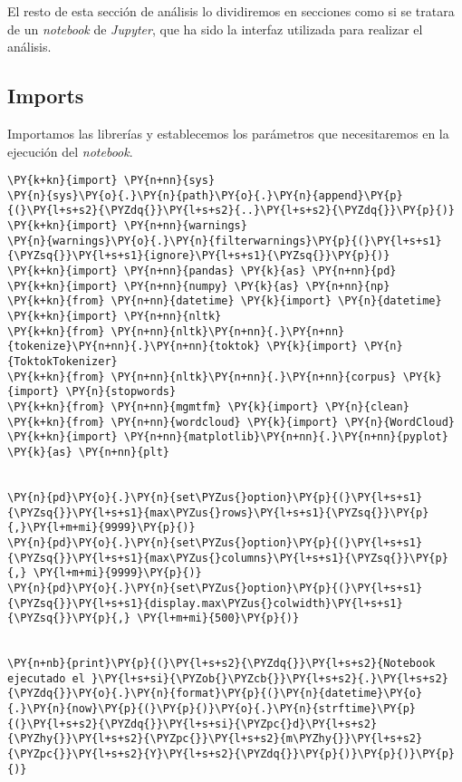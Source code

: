 El resto de esta sección de análisis lo dividiremos en secciones como si se tratara de un \textit{notebook} de \textit{Jupyter}, que ha sido la interfaz utilizada para realizar el análisis.


\subsection{Imports}

   Importamos las librerías y establecemos los parámetros que necesitaremos en la ejecución del \textit{notebook}.

\vspace{0.5cm}

    \begin{tcolorbox}[breakable, size=fbox, boxrule=1pt, pad at break*=1mm,colback=cellbackground, colframe=cellborder]
\begin{Verbatim}[commandchars=\\\{\}]
\PY{k+kn}{import} \PY{n+nn}{sys}
\PY{n}{sys}\PY{o}{.}\PY{n}{path}\PY{o}{.}\PY{n}{append}\PY{p}{(}\PY{l+s+s2}{\PYZdq{}}\PY{l+s+s2}{..}\PY{l+s+s2}{\PYZdq{}}\PY{p}{)}
\PY{k+kn}{import} \PY{n+nn}{warnings}
\PY{n}{warnings}\PY{o}{.}\PY{n}{filterwarnings}\PY{p}{(}\PY{l+s+s1}{\PYZsq{}}\PY{l+s+s1}{ignore}\PY{l+s+s1}{\PYZsq{}}\PY{p}{)}
\PY{k+kn}{import} \PY{n+nn}{pandas} \PY{k}{as} \PY{n+nn}{pd}
\PY{k+kn}{import} \PY{n+nn}{numpy} \PY{k}{as} \PY{n+nn}{np}
\PY{k+kn}{from} \PY{n+nn}{datetime} \PY{k}{import} \PY{n}{datetime}
\PY{k+kn}{import} \PY{n+nn}{nltk}
\PY{k+kn}{from} \PY{n+nn}{nltk}\PY{n+nn}{.}\PY{n+nn}{tokenize}\PY{n+nn}{.}\PY{n+nn}{toktok} \PY{k}{import} \PY{n}{ToktokTokenizer}
\PY{k+kn}{from} \PY{n+nn}{nltk}\PY{n+nn}{.}\PY{n+nn}{corpus} \PY{k}{import} \PY{n}{stopwords}
\PY{k+kn}{from} \PY{n+nn}{mgmtfm} \PY{k}{import} \PY{n}{clean}
\PY{k+kn}{from} \PY{n+nn}{wordcloud} \PY{k}{import} \PY{n}{WordCloud}
\PY{k+kn}{import} \PY{n+nn}{matplotlib}\PY{n+nn}{.}\PY{n+nn}{pyplot} \PY{k}{as} \PY{n+nn}{plt}


\PY{n}{pd}\PY{o}{.}\PY{n}{set\PYZus{}option}\PY{p}{(}\PY{l+s+s1}{\PYZsq{}}\PY{l+s+s1}{max\PYZus{}rows}\PY{l+s+s1}{\PYZsq{}}\PY{p}{,}\PY{l+m+mi}{9999}\PY{p}{)}
\PY{n}{pd}\PY{o}{.}\PY{n}{set\PYZus{}option}\PY{p}{(}\PY{l+s+s1}{\PYZsq{}}\PY{l+s+s1}{max\PYZus{}columns}\PY{l+s+s1}{\PYZsq{}}\PY{p}{,} \PY{l+m+mi}{9999}\PY{p}{)}
\PY{n}{pd}\PY{o}{.}\PY{n}{set\PYZus{}option}\PY{p}{(}\PY{l+s+s1}{\PYZsq{}}\PY{l+s+s1}{display.max\PYZus{}colwidth}\PY{l+s+s1}{\PYZsq{}}\PY{p}{,} \PY{l+m+mi}{500}\PY{p}{)}


\PY{n+nb}{print}\PY{p}{(}\PY{l+s+s2}{\PYZdq{}}\PY{l+s+s2}{Notebook ejecutado el }\PY{l+s+si}{\PYZob{}\PYZcb{}}\PY{l+s+s2}{.}\PY{l+s+s2}{\PYZdq{}}\PY{o}{.}\PY{n}{format}\PY{p}{(}\PY{n}{datetime}\PY{o}{.}\PY{n}{now}\PY{p}{(}\PY{p}{)}\PY{o}{.}\PY{n}{strftime}\PY{p}{(}\PY{l+s+s2}{\PYZdq{}}\PY{l+s+si}{\PYZpc{}d}\PY{l+s+s2}{\PYZhy{}}\PY{l+s+s2}{\PYZpc{}}\PY{l+s+s2}{m\PYZhy{}}\PY{l+s+s2}{\PYZpc{}}\PY{l+s+s2}{Y}\PY{l+s+s2}{\PYZdq{}}\PY{p}{)}\PY{p}{)}\PY{p}{)}
\end{Verbatim}
\end{tcolorbox}

